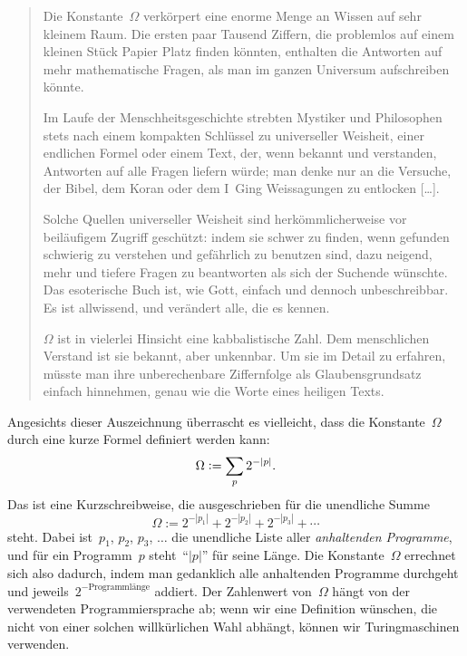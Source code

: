 \documentclass[twoside]{../zirkelblatt1415}
\theoremstyle{definition}
\theoremstyle{plain}
\theoremstyle{remark}
\newcommand{\defeq}{\vcentcolon=}
\begin{document}
\begin{quote}
Die Konstante~$\Omega$ verkörpert eine enorme Menge an Wissen auf sehr kleinem Raum.
Die ersten paar Tausend Ziffern, die problemlos auf einem kleinen Stück Papier
Platz finden könnten, enthalten die Antworten auf mehr mathematische Fragen,
als man im ganzen Universum aufschreiben könnte.

Im Laufe der Menschheitsgeschichte strebten Mystiker und Philosophen stets nach einem
kompakten Schlüssel zu universeller Weisheit, einer endlichen Formel
oder einem Text, der, wenn bekannt und verstanden, Antworten auf alle Fragen
liefern würde; man denke nur an die Versuche, der Bibel, dem Koran oder dem I~Ging
Weissagungen zu entlocken [\ldots].

Solche Quellen universeller Weisheit sind herkömmlicherweise vor beiläufigem
Zugriff geschützt: indem sie schwer zu finden, wenn gefunden schwierig zu
verstehen und gefährlich zu benutzen sind, dazu neigend, mehr und
tiefere Fragen zu beantworten als sich der Suchende wünschte. Das esoterische
Buch ist, wie Gott, einfach und dennoch unbeschreibbar. Es ist allwissend, und
verändert alle, die es kennen.

$\Omega$ ist in vielerlei Hinsicht eine kabbalistische Zahl. Dem menschlichen
Verstand ist sie bekannt, aber unkennbar. Um sie im Detail zu erfahren, müsste
man ihre unberechenbare Ziffernfolge als Glaubensgrundsatz einfach hinnehmen,
genau wie die Worte eines heiligen Texts.
\end{quote}

Angesichts dieser Auszeichnung überrascht es vielleicht, dass die Konstante~$\Omega$
durch eine kurze Formel definiert werden kann:
\[ \Omega \defeq \sum_p 2^{-|p|}. \]
Das ist eine Kurzschreibweise, die ausgeschrieben für die unendliche Summe
\[ \Omega := 2^{-|p_1|} + 2^{-|p_2|} + 2^{-|p_3|} + \cdots \]
steht. Dabei ist~$p_1$, $p_2$, $p_3$, $\ldots$ die unendliche Liste aller
\emph{anhaltenden Programme}, und für ein Programm~$p$ steht~"`$|p|$"' für
seine Länge. Die Konstante~$\Omega$ errechnet sich also dadurch, indem man
gedanklich alle anhaltenden Programme durchgeht und
jeweils~$2^{-\text{Programmlänge}}$ addiert. Der Zahlenwert von~$\Omega$ hängt
von der verwendeten Programmiersprache ab; wenn wir eine Definition wünschen,
die nicht von einer solchen willkürlichen Wahl abhängt, können wir
Turingmaschinen verwenden.
\end{document}
